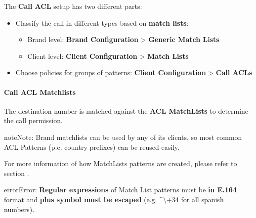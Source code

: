 \documentclass[letterpaper,10pt,english]{sphinxmanual}
\begin{document}
The \textbf{Call ACL} setup has two different parts:
\begin{itemize}
\item {} 
Classify the call in different types based on \textbf{match lists}:
\begin{itemize}
\item {} 
Brand level: \textbf{Brand Configuration} \textgreater{} \textbf{Generic Match Lists}

\item {} 
Client level: \textbf{Client Configuration} \textgreater{} \textbf{Match Lists}

\end{itemize}

\item {} 
Choose policies for groups of patterns: \textbf{Client Configuration} \textgreater{} \textbf{Call
ACLs}

\end{itemize}


\paragraph{Call ACL Matchlists}
\label{administration_portal/client/vpbx/user_configuration/call_acls:call-acl-matchlists}
The destination number is matched against the \textbf{ACL MatchLists} to determine
the call permission.

\begin{notice}{note}{Note:}
Brand matchlists can be used by any of its clients, so most common
ACL Patterns (p.e. country prefixes) can be reused easily.
\end{notice}

For more information of how MatchLists patterns are created, please refer to section
{\hyperref[administration_portal/client/vpbx/routing_tools/match_lists:match\string-lists]{}}.

\begin{notice}{error}{Error:}
\textbf{Regular expressions} of Match List patterns must be \textbf{in E.164} format and \textbf{plus symbol must be
escaped} (e.g. \textasciicircum{}\textbackslash{}+34 for all spanish numbers).
\end{notice}
\end{document}
